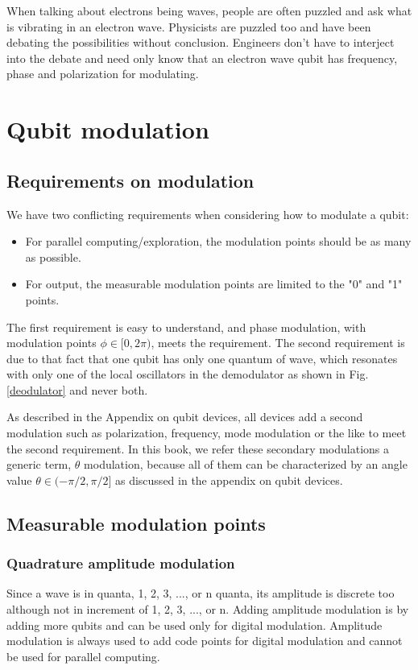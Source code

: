 \documentclass[Letter,11pt]{book}
\begin{document}
When talking about electrons being waves, people are often puzzled and ask what is vibrating in an electron wave. Physicists are puzzled too and have been debating the possibilities without conclusion. Engineers don't have to interject into the debate and need only know that an electron wave qubit has frequency, phase and polarization for modulating.

\section{Qubit modulation}
\subsection{Requirements on modulation}
We have two conflicting requirements when considering how to modulate a qubit:
\begin{itemize}
    \item For parallel computing/exploration, the modulation points should be as many as possible.
    \item For output, the measurable modulation points are limited to the "0" and "1" points.
\end{itemize}

The first requirement is easy to understand, and phase modulation, with modulation points $\phi \in [0, 2\pi)$, meets the requirement. The second requirement is due to that fact that one qubit has only one quantum of wave, which resonates with only one of the local oscillators in the demodulator as shown in Fig. \ref{deodulator} and never both.

As described in the Appendix on qubit devices, all devices add a second modulation such as polarization, frequency, mode modulation or the like to meet the second requirement. In this book, we refer these secondary modulations a generic term, $\theta$ modulation, because all of them can be characterized by an angle value $\theta \in (-\pi/2, \pi/2]$ as discussed in the appendix on qubit devices.

\subsection{Measurable modulation points}
\subsubsection{Quadrature amplitude modulation}
Since a wave is in quanta, 1, 2, 3, ..., or n quanta, its amplitude is discrete too although not in increment of 1, 2, 3, ..., or n. Adding amplitude modulation is by adding more qubits and can be used only for digital modulation. Amplitude modulation is always used to add code points for digital modulation and cannot be used for parallel computing.
\end{document}
